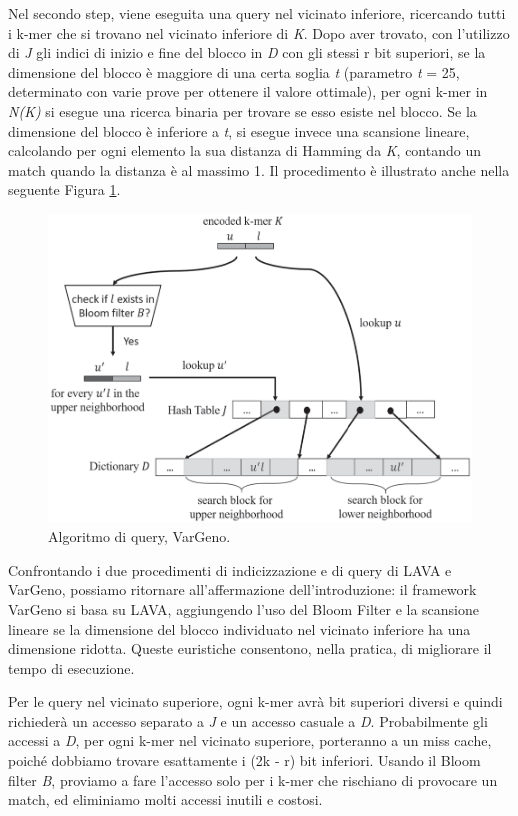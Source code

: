 \documentclass[../main.tex]{subfiles}
\begin{document}
Nel secondo step, viene eseguita una query nel vicinato inferiore, ricercando tutti i k-mer che si trovano nel vicinato inferiore di \textit{K}. Dopo aver trovato, con l'utilizzo di \textit{J} gli indici di inizio e fine del blocco in \textit{D} con gli stessi r bit superiori, se la dimensione del blocco è maggiore di una certa soglia \textit{t} (parametro \textit{t} = 25, determinato con varie prove per ottenere il valore ottimale), per ogni k-mer in \textit{N(K)} si esegue una ricerca binaria per trovare se esso esiste nel blocco. Se la dimensione del blocco è inferiore a \textit{t}, si esegue invece una scansione lineare, calcolando per ogni elemento la sua distanza di Hamming da \textit{K}, contando un match quando la distanza è al massimo 1. Il procedimento è illustrato anche nella seguente Figura \ref{fig:vargeno}.

\begin{figure}[h!]
	\centering
  	\captionsetup{justification=centering}
  	\includegraphics[scale=.40]{images/vargeno-query.png}
  	\caption{Algoritmo di query, VarGeno.}
  	\label{fig:vargeno}
\end{figure}

\noindent
Confrontando i due procedimenti di indicizzazione e di query di LAVA e VarGeno, possiamo ritornare all'affermazione dell'introduzione: il framework VarGeno si basa su LAVA, aggiungendo l'uso del Bloom Filter e la scansione lineare se la dimensione del blocco individuato nel vicinato inferiore ha una dimensione ridotta. Queste euristiche consentono, nella pratica, di migliorare il tempo di esecuzione.

Per le query nel vicinato superiore, ogni k-mer avrà bit superiori diversi e quindi richiederà un accesso separato a \textit{J} e un accesso casuale a \textit{D}. Probabilmente gli accessi a \textit{D}, per ogni k-mer nel vicinato superiore, porteranno a un miss cache, poiché dobbiamo trovare esattamente i (2k - r) bit inferiori. Usando il Bloom filter \textit{B}, proviamo a fare l'accesso solo per i k-mer che rischiano di provocare un match, ed eliminiamo molti accessi inutili e costosi.
\end{document}
